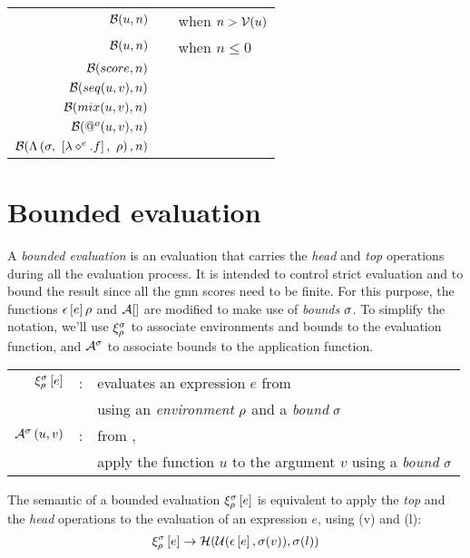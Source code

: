 \documentclass[10pt,a4paper,frenchb]{article}
\makeatletter
\newcommand{\evaltable}[1][$\rightarrow$]	  {\begin{center} \begin{tabular*}{\linewidth}{rc@{ #1 }l}}
\newcommand{\evaltablend}  		{\end{tabular*}\end{center}}
\makeatother
\begin{document}
\evaltable
 \hline
 $\mathcal B(u,n)$					& & \emptyScore \: when $n > \mathcal V(u)$ \\
 $\mathcal B(u,n)$					& & \identity{u} \: when $n \leq 0 $ \\
 $\mathcal B(score,n)$				& & \bottomScore{score}{n} \\
 $\mathcal B(seq(u, v),n)$		& & \bottomSeq{u}{v}{n} \\
 $\mathcal B(mix(u, v),n)$ 		& & \bottomMix{u}{v}{n} \\
 $\mathcal B(@^o (u,v),n)$ 	& & \bottomApply{u}{v}{n} \\
 $\mathcal B(\Lambda\left(\sigma,\ \left[\lambda \diamond^e.f\right],\ \rho \right),n)$ 	& & \bottomClosure{e}{f}{\bounds}{n} \\
 \hline
\evaltablend


\section{Bounded evaluation}

A \emph{bounded evaluation} is an evaluation that carries the \emph{head} and \emph{top} operations during all the evaluation process. 
It is intended to control strict evaluation and to bound the result since all the gmn scores need to be finite.
For this purpose, the functions $\epsilon\left[e\right]\rho$ and $\mathcal A[]$ are modified to make use of \emph{bounds} $\sigma$. To simplify the notation, we'll use $\xi_{\rho}^{\sigma}$ to associate environments and bounds to the evaluation function, and $\mathcal A^{\sigma}$ to associate bounds to the application function. 
\begin{center}
\begin{tabular}{rcl}
$\xi_{\rho}^{\sigma}\left[e\right]$ & : & evaluates an expression $e$ from \edomain{\expr}{\env}{\val} \\
		  & & using an \emph{environment} $\rho$ and a \emph{bound} $\sigma$ \\
$\mathcal A^{\sigma}\left(u,v\right)$  & : & from \edomain{\val}{\val}{\val}, \\
			& & apply the function $u$ to the argument $v$ using a \emph{bound} $\sigma$ \\
\end{tabular}
\end{center}

The semantic of a bounded evaluation $\xi_{\rho}^{\sigma}\left[e\right]$ is equivalent to apply the \emph{top} and the \emph{head} operations to the evaluation of an expression $e$, using \bounds(v) and \bounds(l):
\begin{equation}
\label{equiv}
 \xi_{\rho}^{\sigma}\left[e\right] \rightarrow \mathcal H( \mathcal U( \epsilon\left[e\right], \sigma(v)), \sigma(l))
\end{equation}
\end{document}
